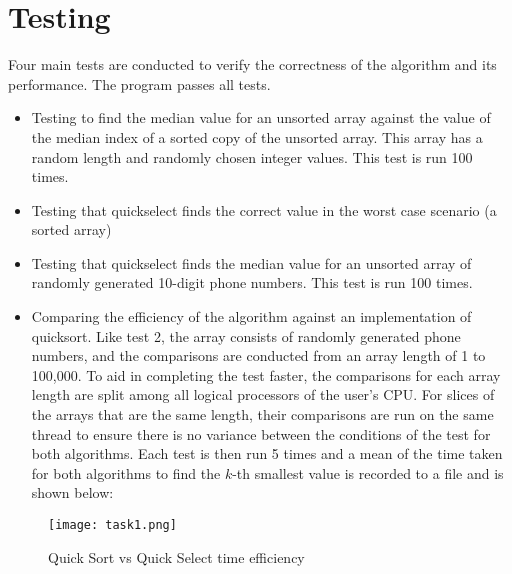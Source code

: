 \documentclass{report}
\begin{document}
\section{Testing}
Four main tests are conducted to verify the correctness of the algorithm and its performance. The program passes all tests.
\begin{itemize}
	\item Testing to find the median value for an unsorted array against the value of the median index of a sorted copy of the unsorted array. This array has a random length and randomly chosen integer values. This test is run 100 times.
	\item Testing that quickselect finds the correct value in the worst case scenario (a sorted array)
	\item Testing that quickselect finds the median value for an unsorted array of randomly generated 10-digit phone numbers. This test is run 100 times.
	\item Comparing the efficiency of the algorithm against an implementation of quicksort. Like test 2, the array consists of randomly generated phone numbers, and the comparisons are conducted from an array length of 1 to 100,000. To aid in completing the test faster, the comparisons for each array length are split among all logical processors of the user's CPU\@. For slices of the arrays that are the same length, their comparisons are run on the same thread to ensure there is no variance between the conditions of the test for both algorithms. Each test is then run 5 times and a mean of the time taken for both algorithms to find the \(k\)-th smallest value is recorded to a file and is shown below:
\end{itemize}

\begin{figure}[H]
	\centering
	\texttt{[image: task1.png]}
	\caption{Quick Sort vs Quick Select time efficiency}
	\label{fig:task1_time_eff}
\end{figure}
\end{document}
